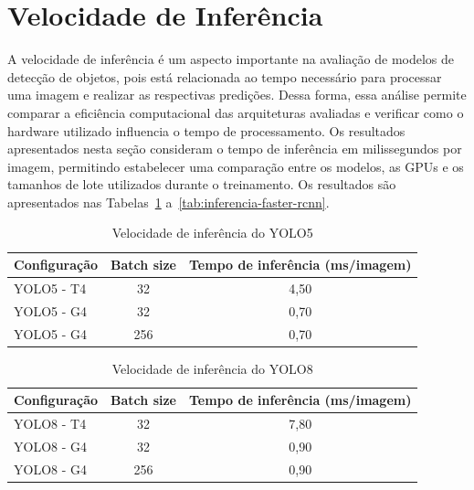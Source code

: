 \section{Velocidade de Inferência}
\label{sec:velocidade-inferencia}

A velocidade de inferência é um aspecto importante na avaliação de modelos de detecção de objetos,
pois está relacionada ao tempo necessário para processar uma imagem e realizar as respectivas
predições. Dessa forma, essa análise permite comparar a eficiência computacional das arquiteturas
avaliadas e verificar como o hardware utilizado influencia o tempo de processamento. Os resultados
apresentados nesta seção consideram o tempo de inferência em milissegundos por imagem, permitindo
estabelecer uma comparação entre os modelos, as GPUs e os tamanhos de lote utilizados durante o
treinamento. Os resultados são apresentados nas Tabelas~\ref{tab:inferencia-yolo5}
a~\ref{tab:inferencia-faster-rcnn}.

\begin{table}[H]
    \caption{Velocidade de inferência do YOLO5}
    \label{tab:inferencia-yolo5}
    \centering
    \small
    \begin{tabular}{lcc}
        \toprule
        \textbf{Configuração} & \textbf{Batch size} & \textbf{Tempo de inferência (ms/imagem)} \\
        \midrule
        YOLO5 - T4  & 32  & 4,50 \\
        YOLO5 - G4  & 32  & 0,70 \\
        YOLO5 - G4  & 256 & 0,70 \\
        \bottomrule
    \end{tabular}
\end{table}
\vspace{-1em}

\begin{table}[H]
    \caption{Velocidade de inferência do YOLO8}
    \label{tab:inferencia-yolo8}
    \centering
    \small
    \begin{tabular}{lcc}
        \toprule
        \textbf{Configuração} & \textbf{Batch size} & \textbf{Tempo de inferência (ms/imagem)} \\
        \midrule
        YOLO8 - T4  & 32  & 7,80 \\
        YOLO8 - G4  & 32  & 0,90 \\
        YOLO8 - G4  & 256 & 0,90 \\
        \bottomrule
    \end{tabular}
\end{table}
\vspace{-1em}

